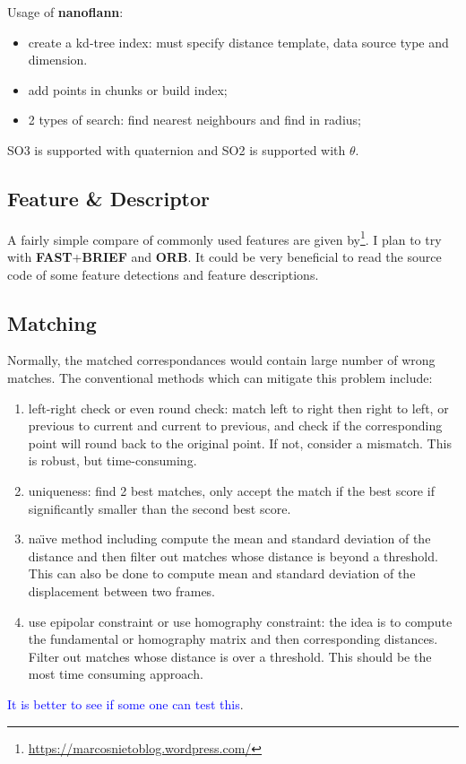 Usage of \textbf{nanoflann}:
\begin{itemize}
\item create a kd-tree index: must specify distance template, data source type and dimension.
\item add points in chunks or build index;
\item 2 types of search: find nearest neighbours and find in radius;
\end{itemize}
SO3 is supported with quaternion and SO2 is supported with $\theta$.

\subsection{Feature \& Descriptor}
A fairly simple compare of commonly used features are given by\footnote{\url{https://marcosnietoblog.wordpress.com/}}.
I plan to try with \textbf{FAST}+\textbf{BRIEF} and \textbf{ORB}.
It could be very beneficial to read the source code of some feature detections and feature descriptions.

\subsection{Matching}
Normally, the matched correspondances would contain large number of wrong matches. The conventional methods which can mitigate this problem include:
\begin{enumerate}
	\item left-right check or even round check: match left to right then right to left, or previous to current and current to previous, and check if the corresponding point will round back to the original point. If not, consider a mismatch. This is robust, but time-consuming.
	\item uniqueness: find 2 best matches, only accept the match if the best score if significantly smaller than the second best score.
	\item na\"{\i}ve method including compute the mean and standard deviation of the distance and then filter out matches whose distance is beyond a threshold. This can also be done to compute mean and standard deviation of the displacement between two frames.
	\item use epipolar constraint or use homography constraint: the idea is to compute the fundamental or homography matrix and then corresponding distances. Filter out matches whose distance is over a threshold. This should be the most time consuming approach.
\end{enumerate}
\textcolor{blue}{It is better to see if some one can test this}.